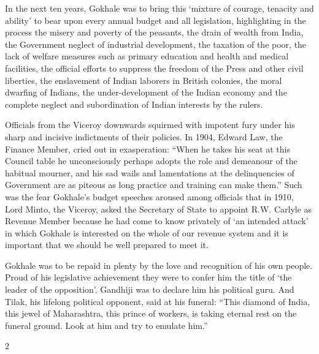 \begin{multicols}{2}
In the next ten years, Gokhale was to bring this `mixture of courage, tenacity and ability' to bear upon every annual budget and all legislation, highlighting in the process the misery and poverty of the peasants, the drain of wealth from India, the Government neglect of industrial development, the taxation of the poor, the lack of welfare measures such as primary education and health and medical facilities, the official efforts to suppress the freedom of the Press and other civil liberties, the enslavement of Indian laborers in British colonies, the moral dwarfing of Indians, the under-development of the Indian economy and the complete neglect and subordination of Indian interests by the rulers.

Officials from the Viceroy downwards squirmed with impotent fury under his sharp and incisive indictments of their policies. In 1904, Edward Law, the Finance Member, cried out in exasperation: ``When he takes his seat at this Council table he unconsciously perhaps adopts the role and demeanour of the habitual mourner, and his sad wails and lamentations at the delinquencies of Government are as piteous as long practice and training can make them.'' Such was the fear Gokhale's budget speeches aroused among officials that in 1910, Lord Minto, the Viceroy, asked the Secretary of State to appoint R.W. Carlyle as Revenue Member because he had come to know privately of `an intended attack' in which Gokhale is interested on the whole of our revenue system and it is important that we should be well prepared to meet it.

Gokhale was to be repaid in plenty by the love and recognition of his own people. Proud of his legislative achievement they were to confer him the title of `the leader of the opposition'. Gandhiji was to declare him his political guru. And Tilak, his lifelong political opponent, said at his funeral: ``This diamond of India, this jewel of Maharashtra, this prince of workers, is taking eternal rest on the funeral ground. Look at him and try to emulate him.''
\end{multicols}{2}
